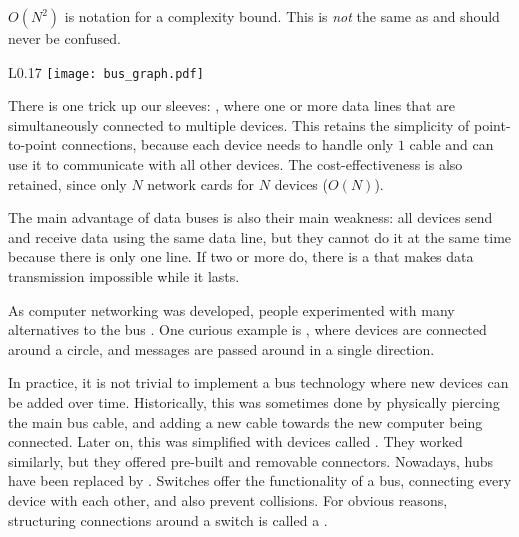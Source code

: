\begin{remark}
$O(N^2)$ is notation for a  complexity bound. 
This is \textit{not} the same as  and should never be confused.
% 
\end{remark}

\begin{wrapfigure}{L}{0.17\linewidth}
\texttt{[image: bus\_graph.pdf]}
\end{wrapfigure}

There is one trick up our sleeves: , where one or more data lines
that are simultaneously connected to multiple devices. 
This retains the simplicity of point-to-point connections, because each device needs to handle
only $1$ cable and can use it to communicate with all other devices. The cost-effectiveness is 
also retained, since only $N$ network cards for $N$ devices ($O(N)$). 

The main advantage of data buses is also their main weakness: 
all devices send and receive data using the same data line, 
but they cannot do it at the same time because there is only one line. If two or more do, there is
a  that makes data transmission impossible while it lasts.\\[-0.5cm]

\begin{remark}
As computer networking was developed, people experimented with many alternatives to the 
bus . One curious example is , where devices
are connected around a circle, and messages are passed around in a single direction.
\end{remark}

In practice, it is not trivial to implement a bus technology 
where new devices can be added over time. 
% 
Historically, this was sometimes done by physically piercing the main bus cable,
and adding a new cable towards the new computer being connected. 
Later on, this was simplified with devices called . 
They worked similarly, but they offered pre-built  
and removable connectors.
% 
Nowadays, hubs have been replaced by . 
Switches offer the functionality of a bus, connecting every device with each other,
and also prevent collisions. For obvious reasons, structuring connections 
around a switch is called a .

